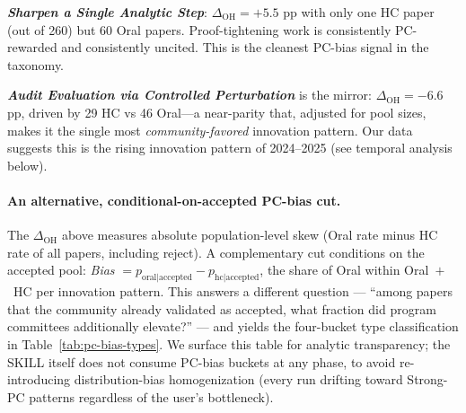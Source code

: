\documentclass[10pt,a4paper]{article}
\begin{document}
\textbf{\emph{Sharpen a Single Analytic Step}}: $\Delta_{\text{OH}}{=}{+}5.5$ pp with only one HC paper (out of 260) but 60 Oral papers. Proof-tightening work is consistently PC-rewarded and consistently uncited. This is the cleanest PC-bias signal in the taxonomy.

\textbf{\emph{Audit Evaluation via Controlled Perturbation}} is the mirror: $\Delta_{\text{OH}}{=}{-}6.6$ pp, driven by 29 HC vs 46 Oral---a near-parity that, adjusted for pool sizes, makes it the single most \emph{community-favored} innovation pattern. Our data suggests this is the rising innovation pattern of 2024--2025 (see temporal analysis below).

\paragraph{An alternative, conditional-on-accepted PC-bias cut.} The $\Delta_{\text{OH}}$ above measures absolute population-level skew (Oral rate minus HC rate of all papers, including reject). A complementary cut conditions on the accepted pool: \emph{Bias} $= p_\text{oral|accepted} - p_\text{hc|accepted}$, the share of Oral within Oral~$+$~HC per innovation pattern. This answers a different question --- ``among papers that the community already validated as accepted, what fraction did program committees additionally elevate?'' --- and yields the four-bucket type classification in Table~\ref{tab:pc-bias-types}. We surface this table for analytic transparency; the SKILL itself does not consume PC-bias buckets at any phase, to avoid re-introducing distribution-bias homogenization (every run drifting toward Strong-PC patterns regardless of the user's bottleneck).
\end{document}
